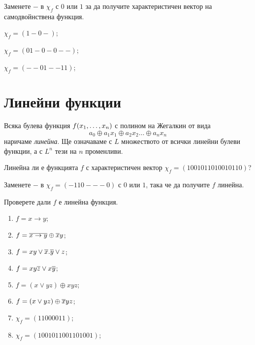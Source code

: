 \begin{problem}
  Заменете $-$ в $\chi_f$ с $0$ или $1$ за да получите характеристичен вектор на самодвойнствена функция.\\
  \begin{inparaenum}[a)]
  \item
    $\chi_f = (1-0-)$;
  \item
    $\chi_f = (01-0-0--)$;
  \item
    $\chi_f = (--01--11)$;
  \end{inparaenum}
\end{problem}

\section{Линейни функции}
Всяка булева функция $f(x_{1},\dots,x_{n})$ с полином на Жегалкин от вида 
\[a_0\oplus a_1x_1 \oplus a_2x_2 \dots\oplus a_nx_n\] наричаме {\em линейна}.
Ще означаваме с $L$ множеството от всички линейни булеви функции, а с $L^n$ тези на $n$ променливи.

\begin{problem}
  Линейна ли е функцията $f$ с характеристичен вектор $\chi_f = (1001011010010110)$?
\end{problem}

\begin{problem}
  Заменете $-$ в $\chi_f = (-110---0)$ с $0$ или $1$, така че да получите $f$ линейна.
\end{problem}


\begin{problem}
  Проверете дали $f$ е линейна функция.
  \begin{enumerate}
  \item
    $f = x\rightarrow y$;
  \item
    $f = \overline{x\rightarrow y}\oplus \overline{x}y$;
  \item
    $f = xy\vee \overline{x}.\overline{y}\vee z$;
  \item
    $f = xy\overline{z}\vee x\overline{y}$;
  \item
    $f = (x\vee yz)\oplus xyz$;
  \item
    $f = (x\vee yz)\oplus \overline{x}yz$;
  \item
    $\chi_f = (1100 0011)$;
  \item
    $\chi_f = (1001 0110 0110 1001)$;
  \end{enumerate}
\end{problem}

